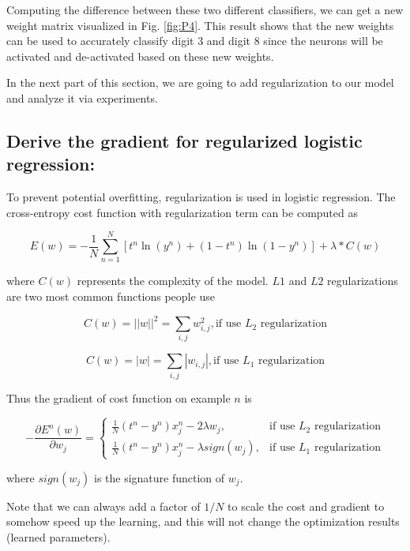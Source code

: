 \documentclass{article} %
\begin{document}
Computing the difference between these two different classifiers, we can get a new weight matrix visualized in Fig. \ref{fig:P4}. This result shows that the new weights can be used to accurately classify digit 3 and digit 8 since the neurons will be activated and de-activated based on these new weights.


In the next part of this section, we are going to add regularization to our model and analyze it via experiments.

\subsection{Derive the gradient for regularized logistic regression:}

To prevent potential overfitting, regularization is used in logistic regression. The cross-entropy cost function with regularization term can be computed as

\begin{equation}
	E(w) = - \frac{1}{N}\sum_{n=1}^{N}[t^{n}\ln(y^{n})+(1-t^{n})\ln(1-y^{n})] + \lambda * C(w)
\end{equation}

where $C(w)$ represents the complexity of the model. $L1$ and $L2$ regularizations are two most common functions people use

\begin{equation}
	C(w) = ||w||^{2} = \sum_{i, j}w_{i, j}^{2}, \text{if use $L_2$ regularization}
\end{equation}

\begin{equation}
	C(w) = |w| = \sum_{i, j}|w_{i, j}|, \text{if use $L_1$ regularization}
\end{equation}

Thus the gradient of cost function on example $n$ is 

\[
    -\frac{\partial E^{n}(w)}{\partial w_{j}} = 
\begin{cases}
    \frac{1}{N}(t^{n}-y^{n})x_{j}^{n} - 2\lambda w_{j},& \text{if use $L_2$ regularization}\\
    \frac{1}{N}(t^{n}-y^{n})x_{j}^{n} - \lambda sign(w_{j}), & \text{if use $L_1$ regularization}
\end{cases}
\]

where $sign(w_{j})$ is the signature function of $w_{j}$. 

Note that we can always add a factor of $1/N$ to scale the cost and gradient to somehow speed up the learning, and this will not change the optimization results (learned parameters).
\end{document}
